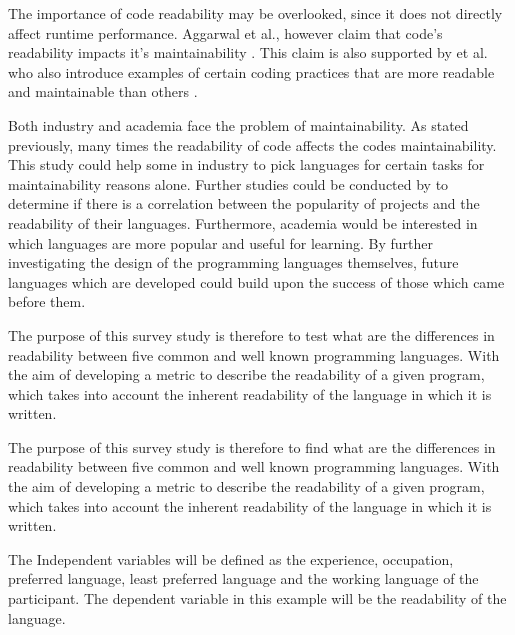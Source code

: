 \documentclass[times, 10pt,twocolumn]{IEEEtran}
\begin{document}
The importance of code readability may be overlooked, since it does not directly affect runtime performance. Aggarwal et al., however claim that code's readability impacts it's maintainability \cite{aggarwal2002integrated}. This claim is also supported by \cite{elshoff1982improving} et al. who also introduce examples of certain coding practices that are more readable and maintainable than others \cite{elshoff1982improving}.




Both industry and academia face the problem of maintainability. As stated previously, many times the readability of code affects the codes maintainability. This study could help some in industry to pick languages for certain tasks for maintainability reasons alone. Further studies could be conducted by to determine if there is a correlation between the popularity of projects and the readability of their languages. Furthermore, academia would be interested in which languages are more popular and useful for learning. By further investigating the design of the programming languages themselves, future languages which are developed could build upon the success of those which came before them.
\newline

The purpose of this survey study is therefore to test what are the differences in readability between five common and well known programming languages. With the aim of developing a metric to describe the readability of a given program, which takes into account the inherent readability of the language in which it is written.
\newline

The purpose of this survey study is therefore to find what are the differences in readability between five common and well known programming languages. With the aim of developing a metric to describe the readability of a given program, which takes into account the inherent readability of the language in which it is written.
\newline

The Independent variables will be defined as the experience, occupation, preferred language, least preferred language and the working language of the participant. The dependent variable in this example will be the readability of the language.
\newline
\end{document}
